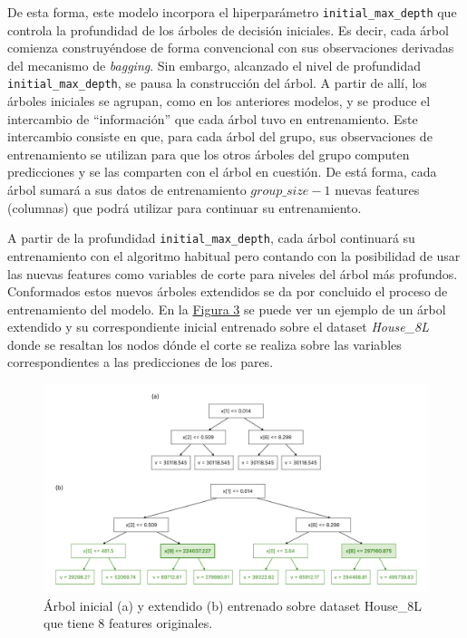 De esta forma, este modelo incorpora el hiperparámetro \texttt{initial\_max\_depth} que controla la profundidad de los árboles de decisión iniciales. Es decir, cada árbol comienza construyéndose de forma convencional con sus observaciones derivadas del mecanismo de \textit{bagging}. Sin embargo, alcanzado el nivel de profundidad \texttt{initial\_max\_depth}, se pausa la construcción del árbol. A partir de allí, los árboles iniciales se agrupan, como en los anteriores modelos, y se produce el intercambio de “información” que cada árbol tuvo en entrenamiento. Este intercambio consiste en que, para cada árbol del grupo, sus observaciones de entrenamiento se utilizan para que los otros árboles del grupo computen predicciones y se las comparten con el árbol en cuestión. De está forma, cada árbol sumará a sus datos de entrenamiento $group\_size - 1$ nuevas features (columnas) que podrá utilizar para continuar su entrenamiento.

A partir de la profundidad \texttt{initial\_max\_depth}, cada árbol continuará su entrenamiento con el algoritmo habitual pero contando con la posibilidad de usar las nuevas features como variables de corte para niveles del árbol más profundos. Conformados estos nuevos árboles extendidos se da por concluido el proceso de entrenamiento del modelo. En la \hyperref[figure3]{Figura 3} se puede ver un ejemplo de un árbol extendido y su correspondiente inicial entrenado sobre el dataset \textit{House\_8L} donde se resaltan los nodos dónde el corte se realiza sobre las variables correspondientes a las predicciones de los pares.

\begin{figure}[h]
\centering
    \includegraphics[width=1\textwidth]{figures/marco-metodologico/SK.png}
\caption{Árbol inicial (a) y extendido (b) entrenado sobre dataset House\_8L que tiene 8 features originales.}
\end{figure}
\label{figure3}

